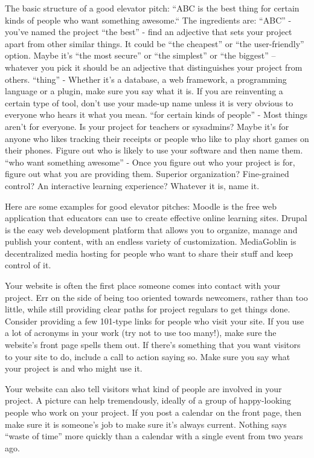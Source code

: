 The basic structure of a good elevator pitch: “ABC is the best thing for certain kinds of people who want something awesome.“ The ingredients are:
“ABC” - you’ve named the project
“the best” - find an adjective that sets your project apart from other similar things. It could be “the cheapest” or “the user-friendly” option. Maybe it’s “the most secure” or “the simplest” or “the biggest” -- whatever you pick it should be an adjective that distinguishes your project from others. 
“thing” - Whether it’s a database, a web framework, a programming language or a plugin, make sure you say what it is. If you are reinventing a certain type of tool, don’t use your made-up name unless it is very obvious to everyone who hears it what you mean. 
“for certain kinds of people” - Most things aren’t for everyone. Is your project for teachers or sysadmins? Maybe it’s for anyone who likes tracking their receipts or people who like to play short games on their phones. Figure out who is likely to use your software and then name them. 
“who want something awesome” - Once you figure out who your project is for, figure out what you are providing them. Superior organization? Fine-grained control? An interactive learning experience? Whatever it is, name it. 

Here are some examples for good elevator pitches:
Moodle is the free web application that educators can use to create effective online learning sites.
Drupal is the easy web development platform that allows you to organize, manage and publish your content, with an endless variety of customization.
MediaGoblin is decentralized media hosting for people who want to share their stuff and keep control of it.

Your website is often the first place someone comes into contact with your project. Err on the side of being too oriented towards newcomers, rather than too little, while still providing clear paths for project regulars to get things done. Consider providing a few 101-type links for people who visit your site. If you use a lot of acronyms in your work (try not to use too many!), make sure the website’s front page spells them out. If there’s something that you want visitors to your site to do, include a call to action saying so. Make sure you say what your project is and who might use it. 

Your website can also tell visitors what kind of people are involved in your project. A picture can help tremendously, ideally of a group of happy-looking people who work on your project. If you post a calendar on the front page, then make sure it is someone’s job to make sure it’s always current. Nothing says “waste of time” more quickly than a calendar with a single event from two years ago.  

